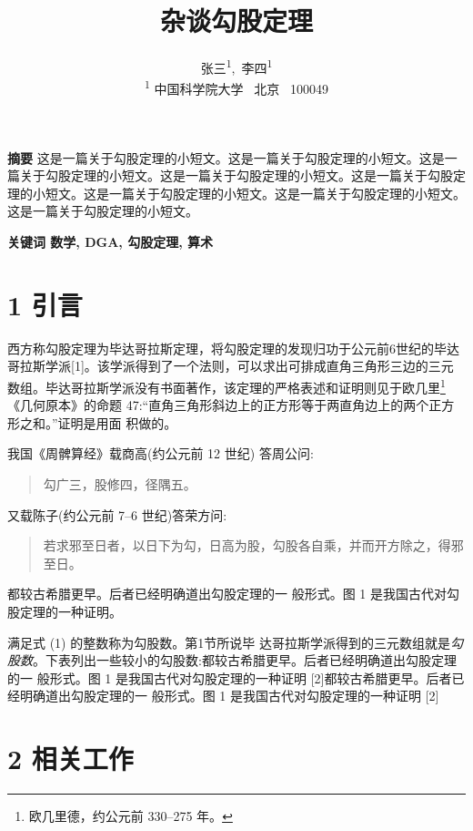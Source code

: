 \documentclass[twocolumn]{ctexart}
\title{杂谈勾股定理}
\author{ 张三\textsuperscript{1},\ 李四\textsuperscript{1}  \\\textsuperscript{1} 中国科学院大学 \ 北京 \ 100049 }
\date{\vspace{-2em}}
\newcommand{\upcite}[1]{\textsuperscript{\textsuperscript{\cite{#1}}}}
\begin{document}
\maketitle

\begin{strip}

\noindent  \textbf{摘要} \quad 这是一篇关于勾股定理的小短文。这是一篇关于勾股定理的小短文。这是一篇关于勾股定理的小短文。这是一篇关于勾股定理的小短文。这是一篇关于勾股定理的小短文。这是一篇关于勾股定理的小短文。这是一篇关于勾股定理的小短文。这是一篇关于勾股定理的小短文。

\noindent  \textbf{关键词 \quad  数学, DGA, 勾股定理, 算术}
\\
\end{strip}


\section*{1  引言}

西方称勾股定理为毕达哥拉斯定理\upcite{2dPose}，将勾股定理的发现归功于公元前6世纪的毕达哥拉斯学派[1]。该学派得到了一个法则，可以求出可排成直角三角形三边的三元数组。毕达哥拉斯学派没有书面著作\upcite{antonakakis2012throw}，该定理的严格表述和证明则见于欧几里\footnote{欧几里德，约公元前 330--275 年。}《几何原本》的命题 47:“直角三角形斜边上的正方形等于两直角边上的两个正方形之和。”证明是用面 积做的\upcite{RFPose}。

我国《周髀算经》载商高(约公元前 12 世纪) 答周公问:
\begin{quote}
    \kaishu 勾广三，股修四，径隅五。
\end{quote}

又载陈子(约公元前 7–6 世纪)答荣方问\upcite{kuhrer2014paint}: 
\begin{quote}
    \kaishu  若求邪至日者，以日下为勾，日高为股，勾股各自乘，并而开方除之，得邪至日。
\end{quote}
都较古希腊更早。后者已经明确道出勾股定理的一 般形式。图 1 是我国古代对勾股定理的一种证明。

满足式 (1) 的整数称为勾股数。第1节所说毕 达哥拉斯学派得到的三元数组就是\emph{勾股数}。下表列出一些较小的勾股数:都较古希腊更早。后者已经明确道出勾股定理的一 般形式。图 1 是我国古代对勾股定理的一种证明 [2]都较古希腊更早。后者已经明确道出勾股定理的一 般形式。图 1 是我国古代对勾股定理的一种证明 [2]

\section*{2 相关工作}
\end{document}
